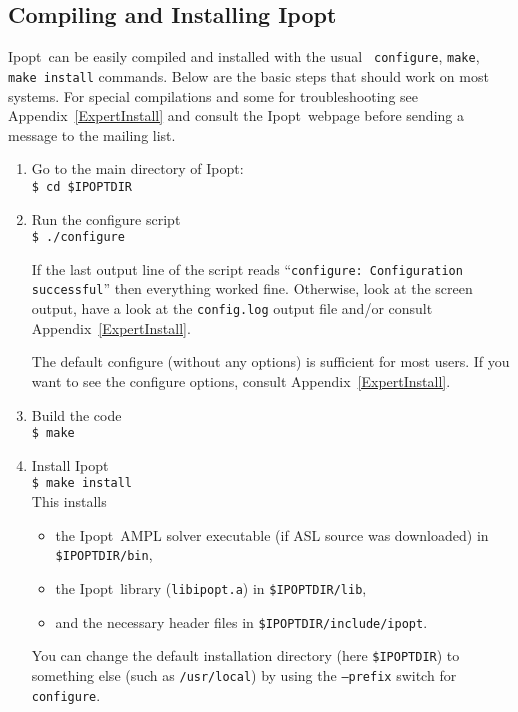 \documentclass[letter,10pt]{article}
\newcommand{\Ipopt}{{\sc Ipopt}}
\begin{document}
\subsection{Compiling and Installing \Ipopt} \label{sec.comp_and_inst}

\Ipopt\ can be easily compiled and installed with the usual {\tt
  configure}, {\tt make}, {\tt make install} commands.  Below are the
basic steps that should work on most systems.  For special
compilations and some for troubleshooting see
Appendix~\ref{ExpertInstall} and consult the \Ipopt\ webpage before
sending a message to the mailing list.
\begin{enumerate}
\item Go to the main directory of \Ipopt:\\
  {\tt \$ cd \$IPOPTDIR} 
\item Run the configure script\\
  {\tt \$ ./configure}

  If the last output line of the script reads ``\texttt{configure:
    Configuration successful}'' then everything worked fine.
  Otherwise, look at the screen output, have a look at the
  \texttt{config.log} output file and/or consult
  Appendix~\ref{ExpertInstall}.

  The default configure (without any options) is sufficient for most
  users. If you want to see the configure options, consult
  Appendix~\ref{ExpertInstall}.
\item Build the code \\
{\tt \$ make}
\item Install \Ipopt \\
  {\tt \$ make install}\\
  This installs
  \begin{itemize}
  \item the \Ipopt\ AMPL solver executable (if ASL source was
    downloaded) in \texttt{\$IPOPTDIR/bin},
  \item the \Ipopt\ library (\texttt{libipopt.a}) in
    \texttt{\$IPOPTDIR/lib},
  \item and the necessary header files in
    \texttt{\$IPOPTDIR/include/ipopt}.
  \end{itemize}
  You can change the default installation directory (here
  \texttt{\$IPOPTDIR}) to something else (such as \texttt{/usr/local})
  by using the \texttt{--prefix} switch for \texttt{configure}.
\end{enumerate}
\end{document}
